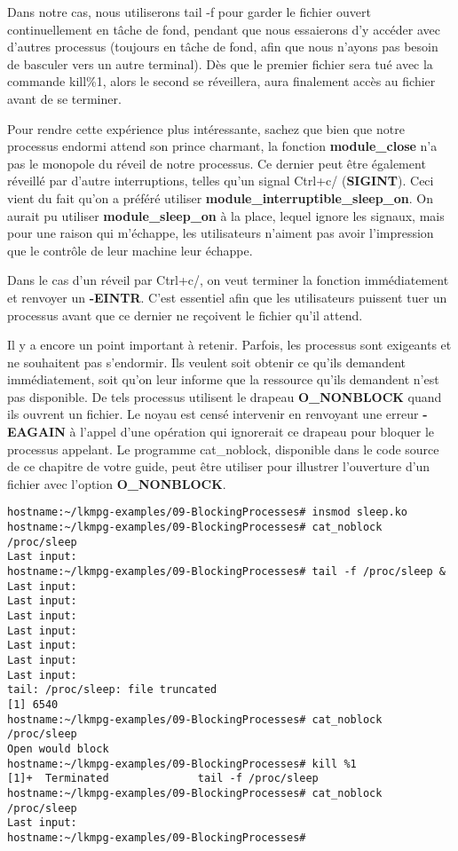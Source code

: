 \documentclass[11pt]{article}
\begin{document}
Dans notre cas, nous utiliserons tail -f pour garder le fichier ouvert continuellement en tâche de fond, pendant que nous essaierons d'y accéder avec d'autres processus (toujours en tâche de fond, afin que nous n'ayons pas besoin de basculer vers un autre terminal). Dès que le premier fichier sera tué avec la commande kill\%1, alors le second se réveillera, aura finalement accès au fichier avant de se terminer.

Pour rendre cette expérience plus intéressante, sachez que bien que notre processus endormi attend son prince charmant, la fonction \textbf{module\_close} n'a pas le monopole du réveil de notre processus. Ce dernier peut être également réveillé par d'autre interruptions, telles qu'un signal Ctrl+c/ (\textbf{SIGINT}). Ceci vient du fait qu'on a préféré utiliser \textbf{module\_interruptible\_sleep\_on}. On aurait pu utiliser \textbf{module\_sleep\_on} à la place, lequel ignore les signaux, mais pour une raison qui m'échappe, les utilisateurs n'aiment pas avoir l'impression que le contrôle de leur machine leur échappe.

Dans le cas d'un réveil par Ctrl+c/, on veut terminer la fonction immédiatement et renvoyer un \textbf{-EINTR}. C'est essentiel afin que les utilisateurs puissent tuer un processus avant que ce dernier ne reçoivent le fichier qu'il attend.

Il y a encore un point important à retenir. Parfois, les processus sont exigeants et ne souhaitent pas s'endormir. Ils veulent soit obtenir ce qu'ils demandent immédiatement, soit qu'on leur informe que la ressource qu'ils demandent n'est pas disponible. De tels processus utilisent le drapeau \textbf{O\_NONBLOCK} quand ils ouvrent un fichier. Le noyau est censé intervenir en renvoyant une erreur \textbf{-EAGAIN} à l'appel d'une opération qui ignorerait ce drapeau pour bloquer le processus appelant. Le programme cat\_noblock, disponible dans le code source de ce chapitre de votre guide, peut être utiliser pour illustrer l'ouverture d'un fichier avec l'option \textbf{O\_NONBLOCK}.

\begin{verbatim}
hostname:~/lkmpg-examples/09-BlockingProcesses# insmod sleep.ko
hostname:~/lkmpg-examples/09-BlockingProcesses# cat_noblock /proc/sleep
Last input:
hostname:~/lkmpg-examples/09-BlockingProcesses# tail -f /proc/sleep &
Last input:
Last input:
Last input:
Last input:
Last input:
Last input:
Last input:
tail: /proc/sleep: file truncated
[1] 6540
hostname:~/lkmpg-examples/09-BlockingProcesses# cat_noblock /proc/sleep
Open would block
hostname:~/lkmpg-examples/09-BlockingProcesses# kill %1
[1]+  Terminated              tail -f /proc/sleep
hostname:~/lkmpg-examples/09-BlockingProcesses# cat_noblock /proc/sleep
Last input:
hostname:~/lkmpg-examples/09-BlockingProcesses#
\end{verbatim}
\end{document}
